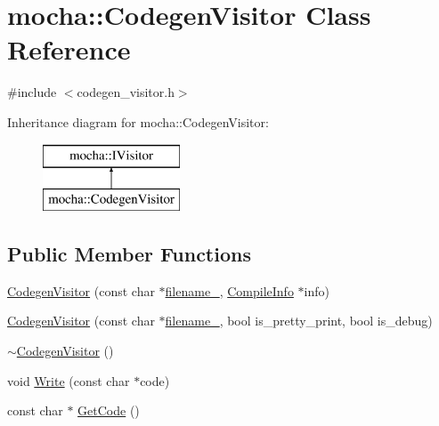\hypertarget{classmocha_1_1_codegen_visitor}{
\section{mocha::CodegenVisitor Class Reference}
\label{classmocha_1_1_codegen_visitor}
}


{\ttfamily \#include $<$codegen\_\-visitor.h$>$}

Inheritance diagram for mocha::CodegenVisitor:\begin{figure}[H]
\begin{center}
\leavevmode
\includegraphics[height=2.000000cm]{classmocha_1_1_codegen_visitor}
\end{center}
\end{figure}
\subsection*{Public Member Functions}
\begin{DoxyCompactItemize}
\item 
\hyperlink{classmocha_1_1_codegen_visitor_aa35625b6ae531e2ca3c529c1c84ab57f}{CodegenVisitor} (const char $\ast$\hyperlink{classmocha_1_1_codegen_visitor_aab8ca0550a471810ff7caa360fbd26b4}{filename\_\-}, \hyperlink{classmocha_1_1_compile_info}{CompileInfo} $\ast$info)
\item 
\hyperlink{classmocha_1_1_codegen_visitor_a90a9952c701d3523d32f4f1b4640f91d}{CodegenVisitor} (const char $\ast$\hyperlink{classmocha_1_1_codegen_visitor_aab8ca0550a471810ff7caa360fbd26b4}{filename\_\-}, bool is\_\-pretty\_\-print, bool is\_\-debug)
\item 
\hyperlink{classmocha_1_1_codegen_visitor_aacc64569f0b7bf04f9f3f55a55f5a180}{$\sim$CodegenVisitor} ()
\item 
void \hyperlink{classmocha_1_1_codegen_visitor_a046d0648f036d9f6e580d3fd7f6223b9}{Write} (const char $\ast$code)
\item 
const char $\ast$ \hyperlink{classmocha_1_1_codegen_visitor_afd3d84940413ff3b974882a8e6b227df}{GetCode} ()
\end{DoxyCompactItemize}
